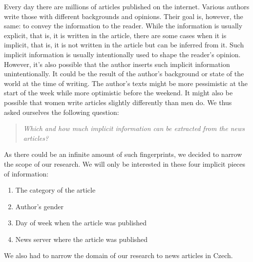 
Every day there are millions of articles published on the internet. Various authors write those
with different backgrounds and opinions. Their goal is, however, the same: to convey the information to the reader.
While the information is usually explicit, that is, it is written in the article, there are some cases when it is implicit, that is,
it is not written in the article but can be inferred from it. Such implicit information 
is usually intentionally used to shape the reader's opinion. However, it's also possible
that the author inserts such implicit information unintentionally. It could
be the result of the author's background or state of the world at the time of writing.
The author's texts might be more pessimistic at the start of the week while more optimistic before the weekend.
It might also be possible that women write articles slightly differently than men do.
We thus asked ourselves the following question:
\begin{quote}
    \textit{Which and how much implicit information can be extracted from the news articles?}
\end{quote}

As there could be an infinite amount of such fingerprints, we decided to narrow the scope of our research.
We will only be interested in these four implicit pieces of information:
\begin{enumerate}
    \item The category of the article
    \item Author's gender
    \item Day of week when the article was published
    \item News server where the article was published
\end{enumerate}
We also had to narrow the domain of our research to news articles in Czech.


